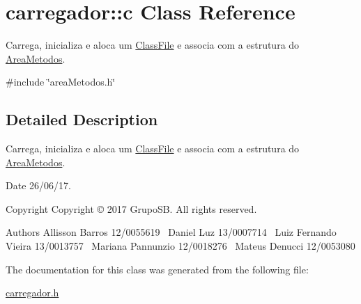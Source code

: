 \hypertarget{classcarregador_1_1c}{}\section{carregador\+:\+:c Class Reference}
\label{classcarregador_1_1c}


Carrega, inicializa e aloca um \hyperlink{structClassFile}{Class\+File} e associa com a estrutura do \hyperlink{structAreaMetodos}{Area\+Metodos}.  




{\ttfamily \#include \char`\"{}area\+Metodos.\+h\char`\"{}}



\subsection{Detailed Description}
Carrega, inicializa e aloca um \hyperlink{structClassFile}{Class\+File} e associa com a estrutura do \hyperlink{structAreaMetodos}{Area\+Metodos}. 

\begin{DoxyDate}{Date}
26/06/17. 
\end{DoxyDate}
\begin{DoxyCopyright}{Copyright}
Copyright © 2017 Grupo\+SB. All rights reserved.
\end{DoxyCopyright}
\begin{DoxyAuthor}{Authors}
Allisson Barros 12/0055619~\newline
Daniel Luz 13/0007714~\newline
Luiz Fernando Vieira 13/0013757~\newline
Mariana Pannunzio 12/0018276~\newline
Mateus Denucci 12/0053080 
\end{DoxyAuthor}


The documentation for this class was generated from the following file\+:\begin{DoxyCompactItemize}
\item 
\hyperlink{carregador_8h}{carregador.\+h}\end{DoxyCompactItemize}
